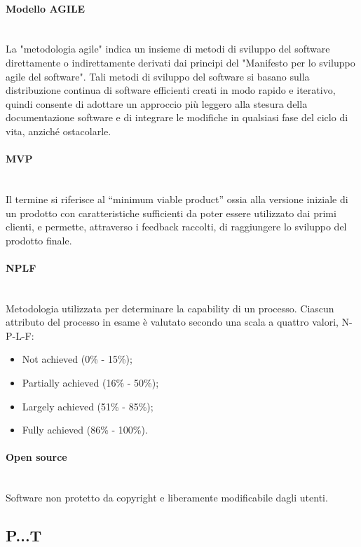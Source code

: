 \paragraph{Modello AGILE}~\smallskip \\
La "metodologia agile" indica un insieme di metodi di sviluppo del software direttamente o indirettamente derivati dai principi del "Manifesto per lo sviluppo agile del software".
Tali metodi di sviluppo del software si basano sulla distribuzione continua di software efficienti creati in modo rapido e iterativo, quindi
consente di adottare un approccio più leggero alla stesura della documentazione software e di integrare le modifiche in qualsiasi fase del ciclo di vita, anziché ostacolarle.

\paragraph{MVP}~\smallskip \\
Il termine si riferisce al “minimum viable product” ossia alla versione iniziale di un prodotto con 
caratteristiche sufficienti da poter essere utilizzato dai primi clienti, e permette, attraverso i feedback raccolti, di raggiungere lo sviluppo del prodotto finale.

\paragraph{NPLF}~\smallskip \\
Metodologia utilizzata per determinare la capability di un processo. Ciascun attributo del processo in esame è valutato secondo una scala a quattro valori, N-P-L-F:
\begin{itemize}
	\item Not achieved (0\% - 15\%);
	\item Partially achieved (16\% - 50\%);
	\item Largely achieved (51\% - 85\%);
    \item Fully achieved (86\% - 100\%).
\end{itemize}

\paragraph{Open source}~\smallskip \\
Software non protetto da copyright e liberamente modificabile dagli utenti.

\subsection{P...T}

